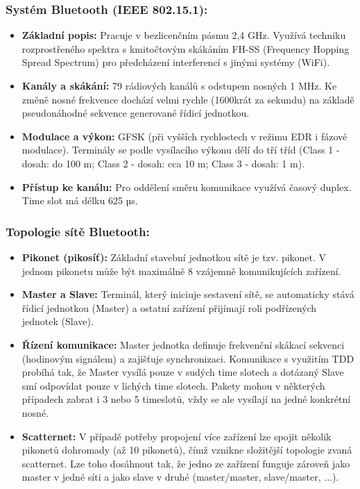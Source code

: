 		\subsubsection*{Systém Bluetooth (IEEE 802.15.1):}
			\begin{itemize}
				\item \textbf{Základní popis:} Pracuje v bezlicenčním pásmu 2,4 GHz. Využívá techniku rozprostřeného spektra s kmitočtovým skákáním FH-SS (Frequency Hopping Spread Spectrum) pro předcházení interferencí s jinými systémy (WiFi).
				\item \textbf{Kanály a skákání:} 79 rádiových kanálů s odstupem nosných 1 MHz. Ke změně nosné frekvence dochází velmi rychle (1600krát za sekundu) na základě pseudonáhodné sekvence generované řídicí jednotkou.
				\item \textbf{Modulace a výkon:} GFSK (při vyšších rychlostech v režimu EDR i fázové modulace). Terminály se podle vysílacího výkonu dělí do tří tříd (Class 1 - dosah: do 100 m; Class 2 - dosah: cca 10 m; Class 3 - dosah: 1 m).
				\item \textbf{Přístup ke kanálu:} Pro oddělení směru komunikace využívá časový duplex. Time slot má délku 625 µs.
			\end{itemize}
		\subsubsection*{Topologie sítě Bluetooth:}
			\begin{itemize}
				\item \textbf{Pikonet (pikosíť):} Základní stavební jednotkou sítě je tzv. pikonet. V jednom pikonetu může být maximálně 8 vzájemně komunikujících zařízení.
				\item \textbf{Master a Slave:} Terminál, který iniciuje sestavení sítě, se automaticky stává řídicí jednotkou (Master) a ostatní zařízení přijímají roli podřízených jednotek (Slave).
				\item \textbf{Řízení komunikace:} Master jednotka definuje frekvenční skákací sekvenci (hodinovým signálem) a zajišťuje synchronizaci. Komunikace s využitím TDD probíhá tak, že Master vysílá pouze v sudých time slotech a dotázaný Slave smí odpovídat pouze v lichých time slotech. Pakety mohou v některých případech zabrat i 3 nebo 5 timeslotů, vždy se ale vysílají na jedné konkrétní nosné.
				\item \textbf{Scatternet:} V případě potřeby propojení více zařízení lze spojit několik pikonetů dohromady (až 10 pikonetů), čímž vznikne složitější topologie zvaná scatternet. Lze toho dosáhnout tak, že jedno ze zařízení funguje zároveň jako master v jedné síti a jako slave v druhé (master/master, slave/master, ...).
			\end{itemize}


